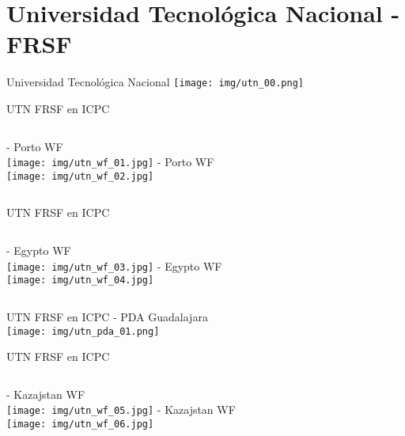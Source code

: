 \documentclass{beamer}
\begin{document}
\section{Universidad Tecnológica Nacional - FRSF}

\begin{frame}{Universidad Tecnológica Nacional}
    \centering
    \texttt{[image: img/utn\_00.png]}
\end{frame}

\begin{frame}{UTN FRSF en ICPC}
    \begin{columns}[t]
         - Porto WF\\
        \texttt{[image: img/utn\_wf\_01.jpg]}
         - Porto WF\\
        \texttt{[image: img/utn\_wf\_02.jpg]}
    \end{columns}
\end{frame}


\begin{frame}{UTN FRSF en ICPC}
    \begin{columns}[t]
         - Egypto WF\\
        \texttt{[image: img/utn\_wf\_03.jpg]}
         - Egypto WF\\
        \texttt{[image: img/utn\_wf\_04.jpg]}
    \end{columns}
\end{frame}

\begin{frame}{UTN FRSF en ICPC}
     - PDA Guadalajara\\
    \texttt{[image: img/utn\_pda\_01.png]}
\end{frame}

\begin{frame}{UTN FRSF en ICPC}
    \begin{columns}[t]
         - Kazajstan WF\\
        \texttt{[image: img/utn\_wf\_05.jpg]}
         - Kazajstan WF\\
        \texttt{[image: img/utn\_wf\_06.jpg]}
    \end{columns}
\end{frame}
\end{document}
